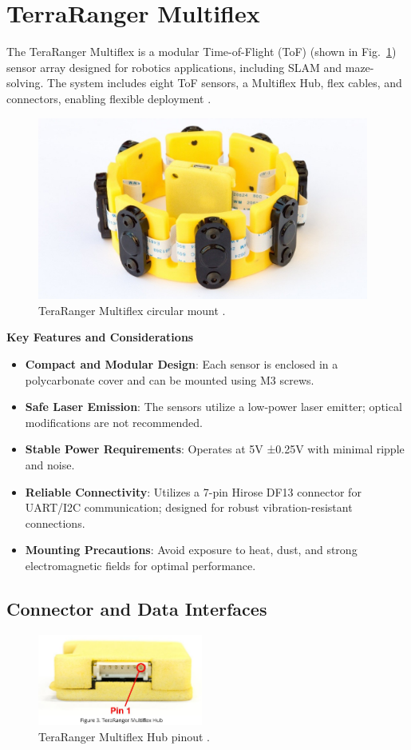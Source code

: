 \section{TerraRanger Multiflex}
The TeraRanger Multiflex is a modular Time-of-Flight (ToF) (shown in Fig.~\ref{fig:terraMount}) sensor array designed for robotics applications, including SLAM and maze-solving. The system includes eight ToF sensors, a Multiflex Hub, flex cables, and connectors, enabling flexible deployment \cite{terra_mount}.

\begin{figure}[H]
	\centering
	\includegraphics[height=6cm]{assets/terraRangerMultiplex.jpg}
	\caption{TeraRanger Multiflex circular mount \cite{terra_mount}.}
	\label{fig:terraMount}
\end{figure}

\textbf{Key Features and Considerations}
\begin{itemize}
	\item \textbf{Compact and Modular Design}: Each sensor is enclosed in a polycarbonate cover and can be mounted using M3 screws.
	\item \textbf{Safe Laser Emission}: The sensors utilize a low-power laser emitter; optical modifications are not recommended.
	\item \textbf{Stable Power Requirements}: Operates at 5V ±0.25V with minimal ripple and noise.
	\item \textbf{Reliable Connectivity}: Utilizes a 7-pin Hirose DF13 connector for UART/I2C communication; designed for robust vibration-resistant connections.
	\item \textbf{Mounting Precautions}: Avoid exposure to heat, dust, and strong electromagnetic fields for optimal performance.
\end{itemize}

\subsection{Connector and Data Interfaces}
\begin{figure}[H]
	\centering
	\includegraphics[height=3cm]{assets/TerraRangerMultflexHubPinout.png}
	\caption{TeraRanger Multiflex Hub pinout \cite{terra_mount}.}
	\label{fig:terraPinout}
\end{figure}

